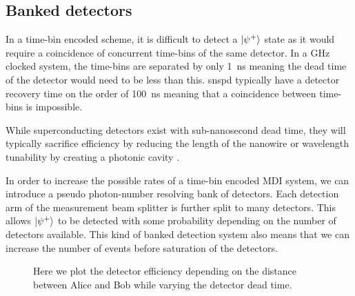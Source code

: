 \subsection{Banked detectors}

In a time-bin encoded scheme, it is difficult to detect a $\ket{\psi^+}$ state as it would require a coincidence of concurrent time-bins of the same detector. In a GHz clocked system, the time-bins are separated by only \SI{1}{\ns} meaning the dead time of the detector would need to be less than this. \ac{snspd} typically have a detector recovery time on the order of \SI{100}{\ns} meaning that a coincidence between time-bins is impossible. 

While superconducting detectors exist with sub-nanosecond dead time, they will typically sacrifice efficiency by reducing the length of the nanowire or wavelength tunability by creating a photonic cavity \cite{vetter2016, yun2019}.

In order to increase the possible rates of a time-bin encoded \ac{MDI} system, we can introduce a pseudo photon-number resolving bank of detectors. Each detection arm of the measurement beam splitter is further split to many detectors. This allows $\ket{\psi^+}$ to be detected with some probability depending on the number of detectors available. This kind of banked detection system also means that we can increase the number of events before saturation of the detectors. 

\begin{figure}[tbp]
	\caption[Detector efficiency depending on detector dead time]{Here we plot the detector efficiency depending on the distance between Alice and Bob while varying the detector dead time. }
	\label{fig:det_eff_dead_time}
\end{figure}

